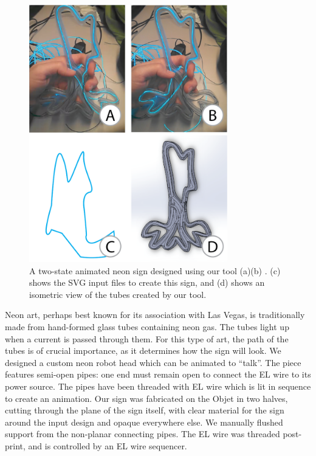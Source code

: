\begin{figure}[h!]
\centering
    \includegraphics[width=3.4in]{figures/sign.png}
\caption{A two-state animated neon sign designed using our tool (a)(b) .  (c) shows the SVG input files to create this sign, and (d) shows an isometric view of the tubes created by our tool. }
\label{fig:neon}
\end{figure}

Neon art, perhaps best known for its association with Las Vegas, is traditionally made from hand-formed glass tubes containing neon gas.  The tubes light up when a current is passed through them.  For this type of art, the path of the tubes is of crucial importance, as it determines how the sign will look.  We designed a custom neon robot head which can be animated to ``talk''.  The piece features semi-open pipes: one end must remain open to connect the EL wire to its power source.  The pipes have been threaded with EL wire which is lit in sequence to create an animation.  Our sign was fabricated on the Objet in two halves, cutting through the plane of the sign itself, with clear material for the sign around the input design and opaque everywhere else.  We manually flushed support from the non-planar connecting pipes.  The EL wire was threaded post-print, and is controlled by an EL wire sequencer.